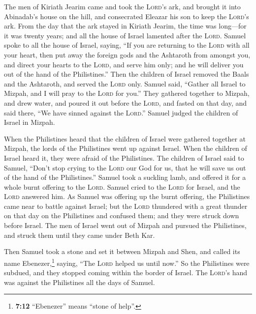  The men of Kiriath Jearim came and took the
\textsc{Lord}'s ark, and brought it into Abinadab's house on the hill,
and consecrated Eleazar his son to keep the \textsc{Lord}'s ark.
 From the day that the ark stayed in Kiriath Jearim, the
time was long---for it was twenty years; and all the house of Israel
lamented after the \textsc{Lord}.  Samuel spoke to all the
house of Israel, saying, ``If you are returning to the \textsc{Lord}
with all your heart, then put away the foreign gods and the Ashtaroth
from amongst you, and direct your hearts to the \textsc{Lord}, and serve
him only; and he will deliver you out of the hand of the Philistines.''
 Then the children of Israel removed the Baals and the
Ashtaroth, and served the \textsc{Lord} only.  Samuel
said, ``Gather all Israel to Mizpah, and I will pray to the
\textsc{Lord} for you.''  They gathered together to
Mizpah, and drew water, and poured it out before the \textsc{Lord}, and
fasted on that day, and said there, ``We have sinned against the
\textsc{Lord}.'' Samuel judged the children of Israel in Mizpah.

 When the Philistines heard that the children of Israel
were gathered together at Mizpah, the lords of the Philistines went up
against Israel. When the children of Israel heard it, they were afraid
of the Philistines.  The children of Israel said to
Samuel, ``Don't stop crying to the \textsc{Lord} our God for us, that he
will save us out of the hand of the Philistines.''  Samuel
took a suckling lamb, and offered it for a whole burnt offering to the
\textsc{Lord}. Samuel cried to the \textsc{Lord} for Israel, and the
\textsc{Lord} answered him.  As Samuel was offering up
the burnt offering, the Philistines came near to battle against Israel;
but the \textsc{Lord} thundered with a great thunder on that day on the
Philistines and confused them; and they were struck down before Israel.
 The men of Israel went out of Mizpah and pursued the
Philistines, and struck them until they came under Beth Kar.

 Then Samuel took a stone and set it between Mizpah and
Shen, and called its name Ebenezer,\footnote{\textbf{7:12} ``Ebenezer''
  means ``stone of help''.} saying, ``The \textsc{Lord} helped us until
now.''  So the Philistines were subdued, and they stopped
coming within the border of Israel. The \textsc{Lord}'s hand was against
the Philistines all the days of Samuel.

